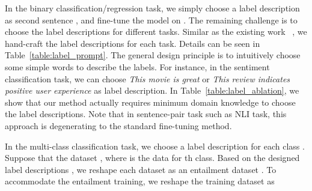 \documentclass{article}
\begin{document}
In the binary classification/regression task, we simply choose a label description  as second sentence , and fine-tune the model on . The remaining challenge is to choose the label descriptions for different tasks. Similar as the existing work ~\citep{schick2020s}, we hand-craft the label descriptions for each task. Details can be seen in Table~\ref{table:label_prompt}. The general design principle is to intuitively choose some simple words to describe the labels. For instance, in the sentiment classification task, we can choose \emph{This movie is great} or \emph{This review indicates positive user experience} as label description. In Table~\ref{table:label_ablation}, we show that our method actually requires minimum domain knowledge to choose the label descriptions. Note that in sentence-pair task such as NLI task, this approach is degenerating to the standard fine-tuning method.

In the multi-class classification task, we choose a label description  for each class . Suppose that the dataset , where  is the data for th class. Based on the designed label descriptions , we reshape each dataset as an entailment dataset . To accommodate the entailment training, we reshape the training dataset as 
\end{document}
